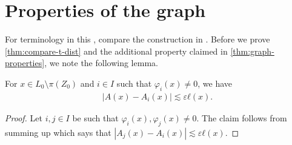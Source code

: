 \documentclass[11pt,a4paper,english,reqno]{amsart}
\numberwithin{equation}{section}
\numberwithin{definition}{section}
\begin{document}
\appendix
\section{Properties of the graph}\label{sec:appendix}

For terminology in this , compare the construction in \cite[Section 7]{tolsaAnalyticCapacityCauchy2014}.
Before we prove \cref{thm:compare-t-dist} and the additional property claimed in \cref{thm:graph-properties}, we note the following lemma.
\begin{lemma}\label{thm:ax-aix-distance}
  For $x\in L_0\setminus π(Z_0)$ and $i\in I$ such that $φ_i(x)\neq 0$, we have
  \begin{align}
    |A(x) - A_i(x)| \lesssim εℓ(x).
  \end{align}
\end{lemma}
\begin{proof}
  Let $i,j\in I$ be such that $φ_i(x),φ_j(x)\neq 0$.
  The claim follows from summing up \cite[Lemma 7.23 (b)]{tolsaAnalyticCapacityCauchy2014} which says that $|A_j(x) - A_i(x)| \lesssim εℓ(x)$.
\end{proof}
\end{document}
